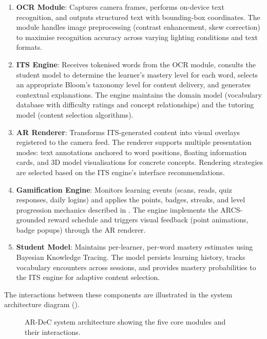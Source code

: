 \begin{enumerate}
    \item \textbf{OCR Module}: Captures camera frames, performs on-device text recognition, and outputs structured text with bounding-box coordinates. The module handles image preprocessing (contrast enhancement, skew correction) to maximise recognition accuracy across varying lighting conditions and text formats.

    \item \textbf{ITS Engine}: Receives tokenised words from the OCR module, consults the student model to determine the learner's mastery level for each word, selects an appropriate Bloom's taxonomy level for content delivery, and generates contextual explanations. The engine maintains the domain model (vocabulary database with difficulty ratings and concept relationships) and the tutoring model (content selection algorithms).

    \item \textbf{AR Renderer}: Transforms ITS-generated content into visual overlays registered to the camera feed. The renderer supports multiple presentation modes: text annotations anchored to word positions, floating information cards, and 3D model visualisations for concrete concepts. Rendering strategies are selected based on the ITS engine's interface recommendations.

    \item \textbf{Gamification Engine}: Monitors learning events (scans, reads, quiz responses, daily logins) and applies the points, badges, streaks, and level progression mechanics described in . The engine implements the ARCS-grounded reward schedule and triggers visual feedback (point animations, badge popups) through the AR renderer.

    \item \textbf{Student Model}: Maintains per-learner, per-word mastery estimates using Bayesian Knowledge Tracing. The model persists learning history, tracks vocabulary encounters across sessions, and provides mastery probabilities to the ITS engine for adaptive content selection.
\end{enumerate}

The interactions between these components are illustrated in the system architecture diagram ().

\begin{landscape}
\begin{figure}[htbp]
    \centering
    
    \caption{AR-DeC system architecture showing the five core modules and their interactions.}
    \label{fig:architecture}
\end{figure}
\end{landscape}

